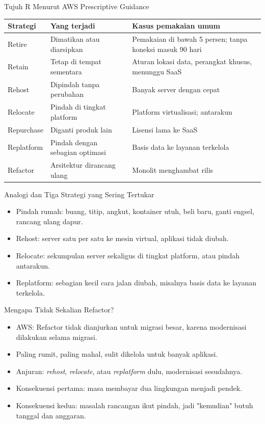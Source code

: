 \documentclass[aspectratio=169, table, 12pt]{beamer}
\begin{document}
\begin{frame}{Tujuh R Menurut AWS Prescriptive Guidance}
  \scriptsize
  \begin{tabularx}{\textwidth}{>{\raggedright\arraybackslash}p{2cm}YY}
    \hline
    \textbf{Strategi} & \textbf{Yang terjadi} & \textbf{Kasus pemakaian umum} \\
    \hline
    Retire & Dimatikan atau diarsipkan & Pemakaian di bawah 5 persen; tanpa koneksi masuk
      90 hari \\
    \hline
    Retain & Tetap di tempat sementara & Aturan lokasi data, perangkat khusus, menunggu
      SaaS \\
    \hline
    Rehost & Dipindah tanpa perubahan & Banyak server dengan cepat \\
    \hline
    Relocate & Pindah di tingkat platform & Platform virtualisasi; antarakun \\
    \hline
    Repurchase & Diganti produk lain & Lisensi lama ke SaaS \\
    \hline
    Replatform & Pindah dengan sebagian optimasi & Basis data ke layanan terkelola \\
    \hline
    Refactor & Arsitektur dirancang ulang & Monolit menghambat rilis \\
    \hline
  \end{tabularx}
\end{frame}

\begin{frame}{Analogi dan Tiga Strategi yang Sering Tertukar}
  \begin{itemize}
    \item Pindah rumah: buang, titip, angkut, kontainer utuh, beli baru, ganti engsel,
          rancang ulang dapur.
    \item Rehost: server satu per satu ke mesin virtual, aplikasi tidak diubah.
    \item Relocate: sekumpulan server sekaligus di tingkat platform, atau pindah antarakun.
    \item Replatform: sebagian kecil cara jalan diubah, misalnya basis data ke layanan
          terkelola.
  \end{itemize}
\end{frame}

\begin{frame}{Mengapa Tidak Sekalian Refactor?}
  \begin{itemize}
    \item AWS: Refactor tidak dianjurkan untuk migrasi besar, karena modernisasi
          dilakukan selama migrasi.
    \item Paling rumit, paling mahal, sulit dikelola untuk banyak aplikasi.
    \item Anjuran: \textit{rehost}, \textit{relocate}, atau \textit{replatform} dulu,
          modernisasi sesudahnya.
    \item Konsekuensi pertama: masa membayar dua lingkungan menjadi pendek.
    \item Konsekuensi kedua: masalah rancangan ikut pindah, jadi "kemudian" butuh
          tanggal dan anggaran.
  \end{itemize}
\end{frame}
\end{document}
